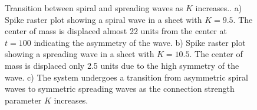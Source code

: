 \begin{figure}[!htb]
 \caption{Transition between spiral and spreading waves as $K$ increases..
          a) Spike raster plot showing a spiral wave in a sheet with $K=9.5$. The center of mass is displaced almost 22 units from the center at $t=100$ indicating the asymmetry of the wave.
          b) Spike raster plot showing a spreading wave in a sheet with $K=10.5$. The center of mass is displaced only 2.5 units due to the high symmetry of the wave.
          c) The system undergoes a transition from asymmetric spiral waves to symmetric spreading waves as the connection strength parameter $K$ increases.
          } 
 \label{fig:2DWaveTransition}
\end{figure}
 \FloatBarrier


